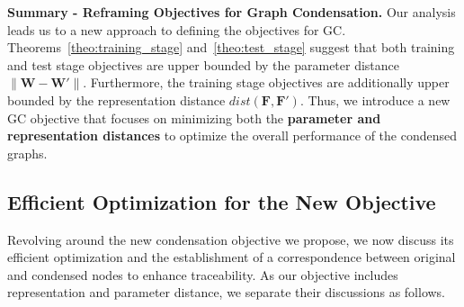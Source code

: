 \textbf{Summary - Reframing Objectives for Graph Condensation.} 
Our analysis leads us to a new approach to defining the objectives for GC. Theorems~\ref{theo:training_stage} and~\ref{theo:test_stage} suggest that both training and test stage objectives are upper bounded by the parameter distance $\|\mathbf{W} - \mathbf{W}'\|$. Furthermore, the training stage objectives are additionally upper bounded by the representation distance $dist(\mathbf{F}, \mathbf{F}')$. Thus, we introduce a new GC objective that focuses on minimizing both the \textbf{parameter and representation distances} to optimize the overall performance of the condensed graphs.



\subsection{Efficient Optimization for the New Objective}
Revolving around the new condensation objective we propose, we now discuss its efficient optimization and the establishment of a correspondence between original and condensed nodes to enhance traceability. As our objective includes representation and parameter distance, we separate their discussions as follows. 


